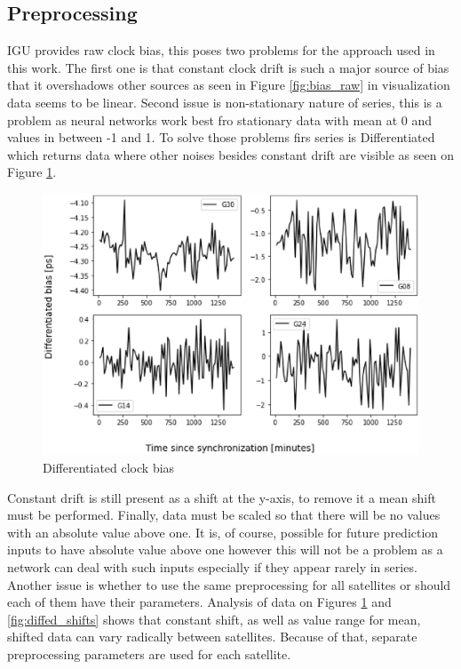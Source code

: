 \documentclass{article}
\begin{document}
\subsection{Preprocessing}
IGU provides raw clock bias, this poses two problems for the approach used in this work.
The first one is that constant clock drift is such a major source of bias that it overshadows other
sources as seen in Figure \ref{fig:bias_raw} in visualization data seems to be linear.
Second issue is non-stationary nature of series, this is a problem as neural networks work best
fro stationary data with mean at 0 and values in between -1 and 1. To solve those problems firs
series is Differentiated which returns data where other noises besides constant drift are visible as
seen on Figure \ref{fig:diffed_bias}.
\begin{figure}[H] 
\centering
\includegraphics[width=\textwidth]{figures/bias_diffed}
\caption{Differentiated clock bias}
\label{fig:diffed_bias}
\end{figure}
Constant drift is still present as a shift at the y-axis, to remove it a mean shift must be performed.
Finally, data must be scaled so that there will be no values with an absolute value above one. It is, of course, possible for future prediction inputs to have absolute value above one however this will
not be a problem as a network can deal with such inputs especially if they appear rarely in series.
Another issue is whether to use the same preprocessing for all satellites or should each of them 
have their parameters.
Analysis of data on Figures \ref{fig:diffed_bias} and \ref{fig:diffed_shifts} shows that
constant shift, as well as value range for mean, shifted data can vary radically between satellites.
Because of that, separate preprocessing parameters are used for each satellite.
\end{document}
